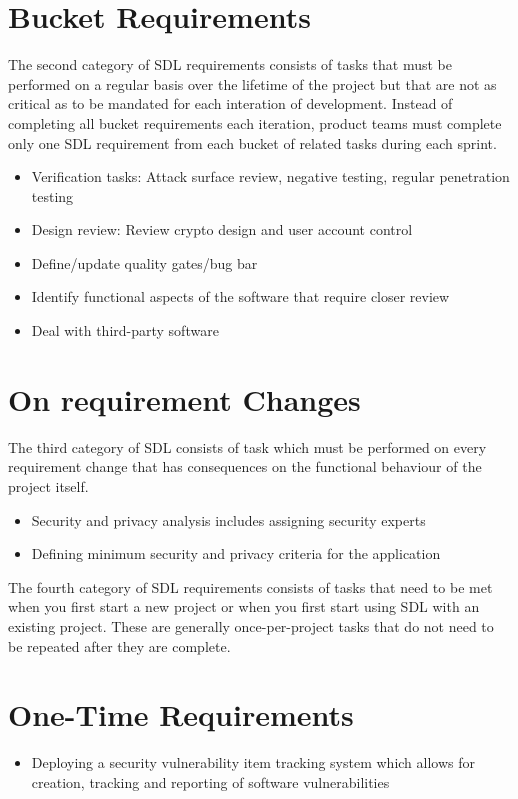 \section{Bucket Requirements}
The second category of SDL requirements consists of tasks that must be performed on a regular basis over the lifetime of the project but that are not as critical as to be mandated for each interation of development.
Instead of completing all bucket requirements each iteration, product teams must complete only one SDL requirement from each bucket of related tasks during each sprint.

\begin{itemize}
	\item Verification tasks: Attack surface review, negative testing, regular penetration testing
	\item Design review: Review crypto design and user account control
	\item Define/update quality gates/bug bar
	\item Identify functional aspects of the software that require closer review
	\item Deal with third-party software
\end{itemize}

\section{On requirement Changes}

The third category of SDL consists of task which must be performed on every requirement change that has consequences on the functional behaviour of the project itself. 

\begin{itemize}
	\item Security and privacy analysis includes assigning security experts
	\item Defining minimum security and privacy criteria for the application
\end{itemize}

The fourth category of SDL requirements consists of tasks that need to be met when you first start a new project or when you first start using SDL with an existing project. These are generally once-per-project tasks that do not need to be repeated after they are complete.

\section{One-Time Requirements}
\begin{itemize}
	\item Deploying a security vulnerability item tracking system which allows for creation, tracking and reporting of software vulnerabilities
\end{itemize}

